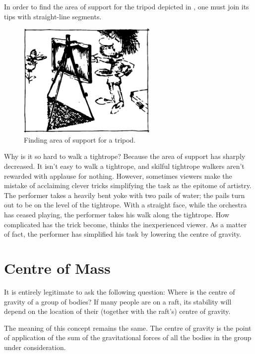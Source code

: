 In order to find the area of support for the tripod depicted in , one must join its tips with straight-line segments.
 \begin{figure}[!ht]
 \centering
 \includegraphics[width=0.6\textwidth]{figures/fig-5-12.pdf}
 \caption{Finding area of support for a tripod.}
 \label{fig-5-12}
 \end{figure}
 
Why is it so hard to walk a tightrope? Because the area of support has sharply decreased. It isn't easy to walk a tightrope, and skilful tightrope walkers aren't rewarded with applause for nothing. However, sometimes viewers make the mistake of acclaiming clever tricks simplifying the task as the epitome of artistry. The performer takes a heavily bent yoke with two pails of water; the pails turn out to be on the level of the tightrope. With a straight face, while the orchestra has ceased playing, the performer takes his walk along the tightrope. How complicated has the trick become, thinks the inexperienced viewer. As a matter of fact, the performer has simplified his task by lowering the centre of gravity.

\section{Centre of Mass}

It is entirely legitimate to ask the following question:
Where is the centre of gravity of a group of bodies? If
many people are on a raft, its stability will depend on
the location of their (together with the raft's) centre of
gravity.

The meaning of this concept remains the same. The
centre of gravity is the point of application of the sum of
the gravitational forces of all the bodies in the group
under consideration.

